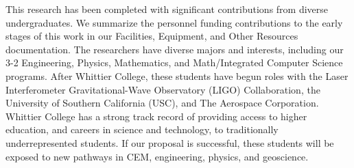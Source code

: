 \documentclass[../../main.tex]{subfiles}
\begin{document}
This research has been completed with significant contributions from diverse undergraduates.  We summarize the personnel funding contributions to the early stages of this work in our Facilities, Equipment, and Other Resources documentation.  The researchers have diverse majors and interests, including our 3-2 Engineering, Physics, Mathematics, and Math/Integrated Computer Science programs.   After Whittier College, these students have begun roles with the Laser Interferometer Gravitational-Wave Observatory (LIGO) Collaboration, the University of Southern California (USC), and The Aerospace Corporation.  Whittier College has a strong track record of providing access to higher education, and careers in science and technology, to traditionally underrepresented students.  If our proposal is successful, these students will be exposed to new pathways in CEM, engineering, physics, and geoscience. \\ \vspace{2.5mm}
\end{document}
